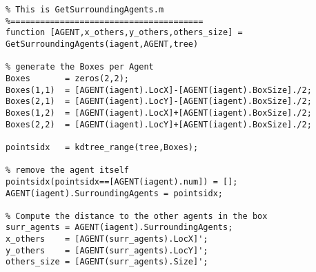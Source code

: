 \lstset{basicstyle=\footnotesize\ttfamily}
    
\begin{lstlisting}[breaklines]
%=======================================
% This is GetSurroundingAgents.m
%=======================================
function [AGENT,x_others,y_others,others_size] = GetSurroundingAgents(iagent,AGENT,tree)

% generate the Boxes per Agent
Boxes       = zeros(2,2);
Boxes(1,1)  = [AGENT(iagent).LocX]-[AGENT(iagent).BoxSize]./2;
Boxes(2,1)  = [AGENT(iagent).LocY]-[AGENT(iagent).BoxSize]./2;
Boxes(1,2)  = [AGENT(iagent).LocX]+[AGENT(iagent).BoxSize]./2;
Boxes(2,2)  = [AGENT(iagent).LocY]+[AGENT(iagent).BoxSize]./2;

pointsidx 	= kdtree_range(tree,Boxes);

% remove the agent itself
pointsidx(pointsidx==[AGENT(iagent).num]) = [];
AGENT(iagent).SurroundingAgents = pointsidx;

% Compute the distance to the other agents in the box
surr_agents = AGENT(iagent).SurroundingAgents;
x_others    = [AGENT(surr_agents).LocX]';
y_others    = [AGENT(surr_agents).LocY]';
others_size = [AGENT(surr_agents).Size]';
\end{lstlisting}